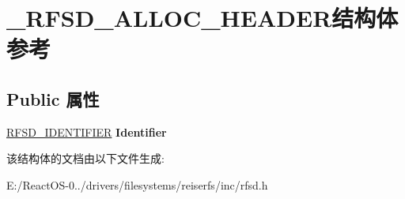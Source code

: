 \hypertarget{struct___r_f_s_d___a_l_l_o_c___h_e_a_d_e_r}{}\section{\+\_\+\+R\+F\+S\+D\+\_\+\+A\+L\+L\+O\+C\+\_\+\+H\+E\+A\+D\+E\+R结构体 参考}
\label{struct___r_f_s_d___a_l_l_o_c___h_e_a_d_e_r}
\subsection*{Public 属性}
\begin{DoxyCompactItemize}
\item 
\mbox{\label{struct___r_f_s_d___a_l_l_o_c___h_e_a_d_e_r_a1d3720fc9604ac319d8fbc95ac3d0bea}} 
\hyperlink{struct___r_f_s_d___i_d_e_n_t_i_f_i_e_r}{R\+F\+S\+D\+\_\+\+I\+D\+E\+N\+T\+I\+F\+I\+ER} {\bfseries Identifier}
\end{DoxyCompactItemize}


该结构体的文档由以下文件生成\+:\begin{DoxyCompactItemize}
\item 
E\+:/\+React\+O\+S-\/0../drivers/filesystems/reiserfs/inc/rfsd.\+h\end{DoxyCompactItemize}
